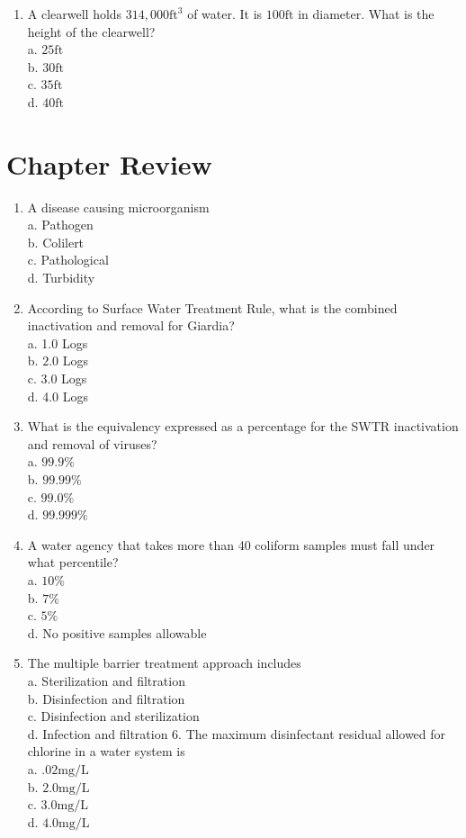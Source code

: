 \documentclass[10pt]{article}
\begin{document}
\begin{enumerate}
  \item A clearwell holds $314,000 \mathrm{ft}^{3}$ of water. It is $100 \mathrm{ft}$ in diameter. What is the height of the clearwell?\\
a. $25 \mathrm{ft}$\\
b. $30 \mathrm{ft}$\\
c. $35 \mathrm{ft}$\\
d. $40 \mathrm{ft}$

\end{enumerate}
\section{Chapter Review}
\begin{enumerate}
  \item A disease causing microorganism\\
a. Pathogen\\
b. Colilert\\
c. Pathological\\
d. Turbidity

  \item According to Surface Water Treatment Rule, what is the combined inactivation and removal for Giardia?\\
a. 1.0 Logs\\
b. $2.0$ Logs\\
c. 3.0 Logs\\
d. 4.0 Logs

  \item What is the equivalency expressed as a percentage for the SWTR inactivation and removal of viruses?\\
a. $99.9 \%$\\
b. $99.99 \%$\\
c. $99.0 \%$\\
d. $99.999 \%$

  \item A water agency that takes more than 40 coliform samples must fall under what percentile?\\
a. $10 \%$\\
b. $7 \%$\\
c. $5 \%$\\
d. No positive samples allowable

  \item The multiple barrier treatment approach includes\\
a. Sterilization and filtration\\
b. Disinfection and filtration\\
c. Disinfection and sterilization\\
d. Infection and filtration 6. The maximum disinfectant residual allowed for chlorine in a water system is\\
a. $.02 \mathrm{mg} / \mathrm{L}$\\
b. $2.0 \mathrm{mg} / \mathrm{L}$\\
c. $3.0 \mathrm{mg} / \mathrm{L}$\\
d. $4.0 \mathrm{mg} / \mathrm{L}$


\end{enumerate}
\end{document}

